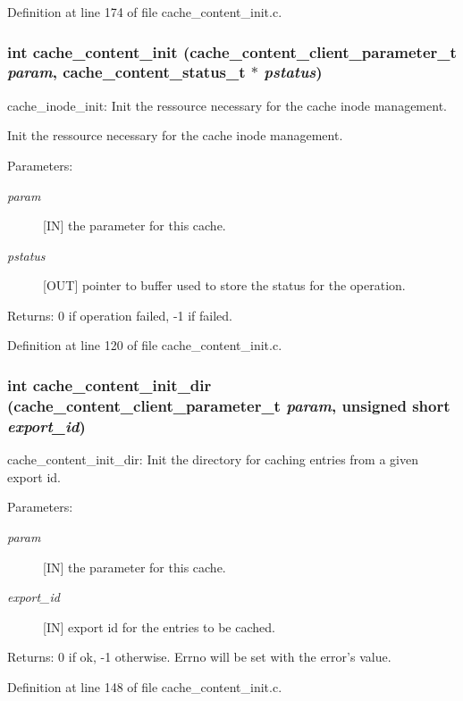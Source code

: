 Definition at line 174 of file cache\_\-content\_\-init.c.
\subsubsection{\setlength{\rightskip}{0pt plus 5cm}int cache\_\-content\_\-init (cache\_\-content\_\-client\_\-parameter\_\-t {\em param}, cache\_\-content\_\-status\_\-t $\ast$ {\em pstatus})}\label{cache__content__init_8c_a0}


cache\_\-inode\_\-init: Init the ressource necessary for the cache inode management.

Init the ressource necessary for the cache inode management.

\begin{Desc}
\item[Parameters:]
\begin{description}
\item[{\em param}][IN] the parameter for this cache. \item[{\em pstatus}][OUT] pointer to buffer used to store the status for the operation.\end{description}
\end{Desc}
\begin{Desc}
\item[Returns:]0 if operation failed, -1 if failed. \end{Desc}


Definition at line 120 of file cache\_\-content\_\-init.c.
\subsubsection{\setlength{\rightskip}{0pt plus 5cm}int cache\_\-content\_\-init\_\-dir (cache\_\-content\_\-client\_\-parameter\_\-t {\em param}, unsigned short {\em export\_\-id})}\label{cache__content__init_8c_a1}


cache\_\-content\_\-init\_\-dir: Init the directory for caching entries from a given export id.

\begin{Desc}
\item[Parameters:]
\begin{description}
\item[{\em param}][IN] the parameter for this cache. \item[{\em export\_\-id}][IN] export id for the entries to be cached.\end{description}
\end{Desc}
\begin{Desc}
\item[Returns:]0 if ok, -1 otherwise. Errno will be set with the error's value. \end{Desc}


Definition at line 148 of file cache\_\-content\_\-init.c.